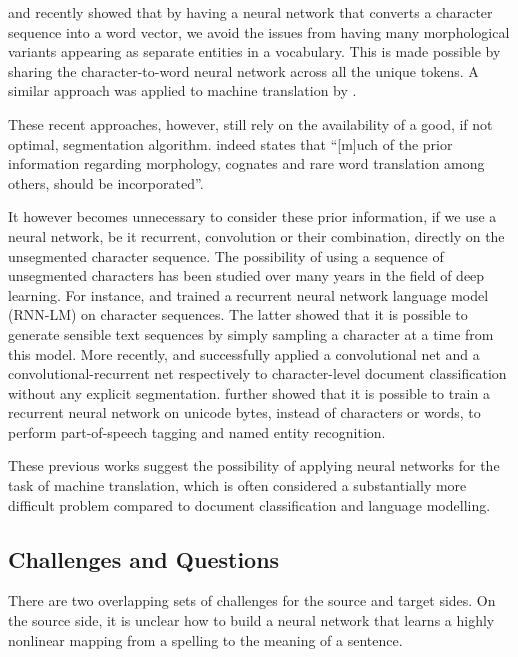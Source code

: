 \documentclass[11pt]{article}
\begin{document}
 and  recently showed that by
having a neural network that converts a character sequence into a word vector,
we avoid the issues from having many morphological variants appearing as
separate entities in a vocabulary.  This is made possible by sharing the
character-to-word neural network across all the unique tokens. A similar
approach was applied to machine translation by .

These recent approaches, however, still rely on the availability of a good, if
not optimal, segmentation algorithm.  indeed states
that ``[m]uch of the prior information regarding morphology, cognates and rare
word translation among others, should be incorporated''.

It however becomes unnecessary to consider these prior information, if we use a
neural network, be it recurrent, convolution or their combination, directly on
the unsegmented character sequence. The possibility of using a sequence of
unsegmented characters has been studied over many years in the field of deep
learning. For instance,  and
 trained a recurrent neural network language
model (RNN-LM) on character sequences. The latter showed that it is possible to
generate sensible text sequences by simply sampling a character at a time from
this model. More recently,  and
 successfully applied a convolutional net and a
convolutional-recurrent net respectively to character-level document
classification without any explicit segmentation.
 further showed that it is possible to
train a recurrent neural network on unicode bytes, instead of characters or words,
 to perform part-of-speech tagging and named entity recognition. 

These previous works suggest the possibility of applying neural networks for the task of machine translation,
which is often considered a substantially more difficult problem compared to
document classification and language modelling.

\subsection{Challenges and Questions}

There are two overlapping sets of challenges for the source and target sides. On
the source side, it is unclear how to build a neural network that learns a
highly nonlinear mapping from a spelling to the meaning of a sentence.  
\end{document}
